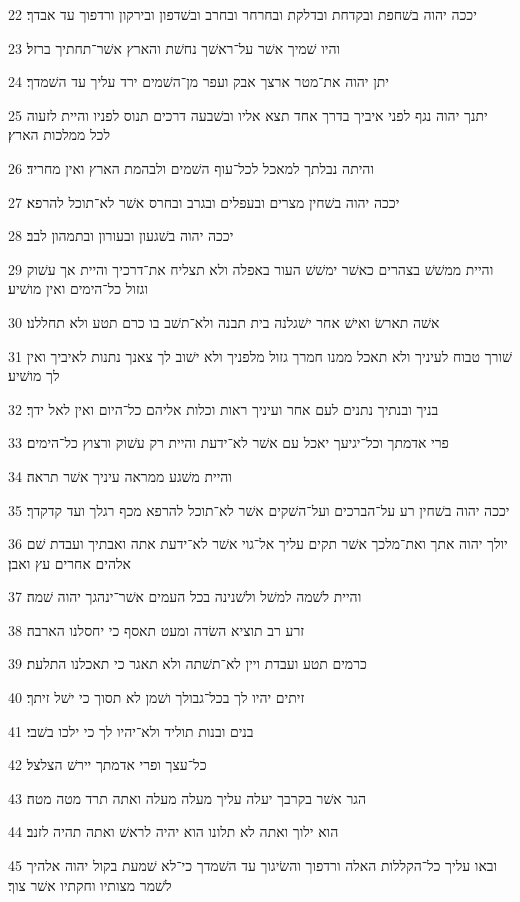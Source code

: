 \par 22 יככה יהוה בשׁחפת ובקדחת ובדלקת ובחרחר ובחרב ובשׁדפון ובירקון ורדפוך עד אבדך׃
\par 23 והיו שׁמיך אשׁר על־ראשׁך נחשׁת והארץ אשׁר־תחתיך ברזל׃
\par 24 יתן יהוה את־מטר ארצך אבק ועפר מן־השׁמים ירד עליך עד השׁמדך׃
\par 25 יתנך יהוה נגף לפני איביך בדרך אחד תצא אליו ובשׁבעה דרכים תנוס לפניו והיית לזעוה לכל ממלכות הארץ׃
\par 26 והיתה נבלתך למאכל לכל־עוף השׁמים ולבהמת הארץ ואין מחריד׃
\par 27 יככה יהוה בשׁחין מצרים ובעפלים ובגרב ובחרס אשׁר לא־תוכל להרפא׃
\par 28 יככה יהוה בשׁגעון ובעורון ובתמהון לבב׃
\par 29 והיית ממשׁשׁ בצהרים כאשׁר ימשׁשׁ העור באפלה ולא תצליח את־דרכיך והיית אך עשׁוק וגזול כל־הימים ואין מושׁיע׃
\par 30 אשׁה תארשׂ ואישׁ אחר ישׁגלנה בית תבנה ולא־תשׁב בו כרם תטע ולא תחללנו׃
\par 31 שׁורך טבוח לעיניך ולא תאכל ממנו חמרך גזול מלפניך ולא ישׁוב לך צאנך נתנות לאיביך ואין לך מושׁיע׃
\par 32 בניך ובנתיך נתנים לעם אחר ועיניך ראות וכלות אליהם כל־היום ואין לאל ידך׃
\par 33 פרי אדמתך וכל־יגיעך יאכל עם אשׁר לא־ידעת והיית רק עשׁוק ורצוץ כל־הימים׃
\par 34 והיית משׁגע ממראה עיניך אשׁר תראה׃
\par 35 יככה יהוה בשׁחין רע על־הברכים ועל־השׁקים אשׁר לא־תוכל להרפא מכף רגלך ועד קדקדך׃
\par 36 יולך יהוה אתך ואת־מלכך אשׁר תקים עליך אל־גוי אשׁר לא־ידעת אתה ואבתיך ועבדת שׁם אלהים אחרים עץ ואבן׃
\par 37 והיית לשׁמה למשׁל ולשׁנינה בכל העמים אשׁר־ינהגך יהוה שׁמה׃
\par 38 זרע רב תוציא השׂדה ומעט תאסף כי יחסלנו הארבה׃
\par 39 כרמים תטע ועבדת ויין לא־תשׁתה ולא תאגר כי תאכלנו התלעת׃
\par 40 זיתים יהיו לך בכל־גבולך ושׁמן לא תסוך כי ישׁל זיתך׃
\par 41 בנים ובנות תוליד ולא־יהיו לך כי ילכו בשׁבי׃
\par 42 כל־עצך ופרי אדמתך יירשׁ הצלצל׃
\par 43 הגר אשׁר בקרבך יעלה עליך מעלה מעלה ואתה תרד מטה מטה׃
\par 44 הוא ילוך ואתה לא תלונו הוא יהיה לראשׁ ואתה תהיה לזנב׃
\par 45 ובאו עליך כל־הקללות האלה ורדפוך והשׂיגוך עד השׁמדך כי־לא שׁמעת בקול יהוה אלהיך לשׁמר מצותיו וחקתיו אשׁר צוך׃
